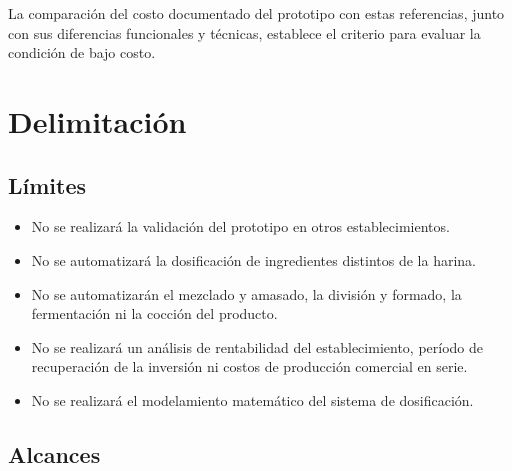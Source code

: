 La comparación del costo documentado del prototipo con estas referencias,
junto con sus diferencias funcionales y técnicas, establece el criterio para
evaluar la condición de bajo costo.


\section{Delimitación}
\label{sec:delimitacion}


\subsection{Límites}
\label{subsec:limites}

\begin{itemize}

    \item No se realizará la validación del prototipo en otros
    establecimientos.

    \item No se automatizará la dosificación de ingredientes distintos
    de la harina.

    \item No se automatizarán el mezclado y amasado, la división y formado,
    la fermentación ni la cocción del producto.

    \item No se realizará un análisis de rentabilidad del establecimiento,
    período de recuperación de la inversión ni costos de producción
    comercial en serie.

    \item No se realizará el modelamiento matemático del sistema de dosificación.

\end{itemize}


\subsection{Alcances}
\label{subsec:alcances}


